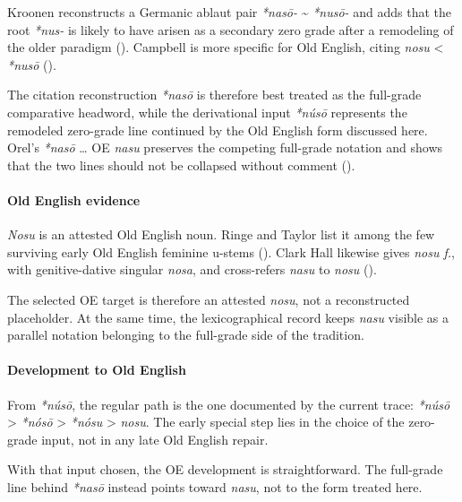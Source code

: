\documentclass[
  british,
  a4paper,
]{article}
\begin{document}
Kroonen reconstructs a Germanic ablaut pair \emph{*nasō-}
\textasciitilde{} \emph{*nusō-} and adds that the root \emph{*nus-} is
likely to have arisen as a secondary zero grade after a remodeling of
the older paradigm ().
Campbell is more specific for Old English, citing \emph{nosu}
\textless{} \emph{*nusō} ().

The citation reconstruction \emph{*nasō} is therefore best treated as
the full-grade comparative headword, while the derivational input
\emph{*núsō} represents the remodeled zero-grade line continued by the
Old English form discussed here. Orel's \emph{*nasō} \ldots{} OE
\emph{nasu} preserves the competing full-grade notation and shows that
the two lines should not be collapsed without comment
().

\paragraph{Old English evidence}\label{old-english-evidence-22}

\emph{Nosu} is an attested Old English noun. Ringe and Taylor list it
among the few surviving early Old English feminine u-stems
(). Clark Hall
likewise gives \emph{nosu f.}, with genitive-dative singular
\emph{nosa}, and cross-refers \emph{nasu} to \emph{nosu}
().

The selected OE target is therefore an attested \emph{nosu}, not a
reconstructed placeholder. At the same time, the lexicographical record
keeps \emph{nasu} visible as a parallel notation belonging to the
full-grade side of the tradition.

\paragraph{Development to Old
English}\label{development-to-old-english-22}

From \emph{*núsō}, the regular path is the one documented by the current
trace: \emph{*núsō} \textgreater{} \emph{*nósō} \textgreater{}
\emph{*nósu} \textgreater{} \emph{nosu}. The early special step lies in
the choice of the zero-grade input, not in any late Old English repair.

With that input chosen, the OE development is straightforward. The
full-grade line behind \emph{*nasō} instead points toward \emph{nasu},
not to the form treated here.
\end{document}
